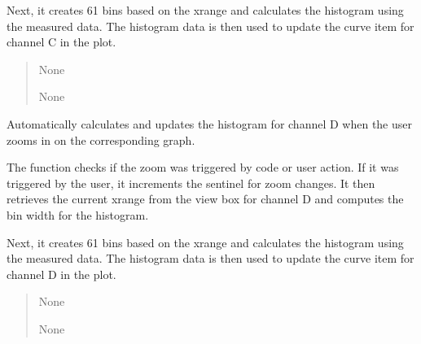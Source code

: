 \documentclass[letterpaper,10pt,english]{sphinxmanual}
\begin{document}
\begin{fulllineitems}
\begin{fulllineitems}
\sphinxAtStartPar
Next, it creates 61 bins based on the x\sphinxhyphen{}range and calculates the histogram 
using the measured data. The histogram data is then used to update the curve 
item for channel C in the plot.
\begin{quote}\begin{description}
\sphinxAtStartPar
None

\sphinxAtStartPar
None

\end{description}\end{quote}

\end{fulllineitems}


\begin{fulllineitems}
\label{\detokenize{StartStopHist:StartStopHist.StartStopLogic.zoom_changedD}}
\pysigstartsignatures
{}
\pysigstopsignatures
\sphinxAtStartPar
Automatically calculates and updates the histogram for channel D when the user 
zooms in on the corresponding graph.

\sphinxAtStartPar
The function checks if the zoom was triggered by code or user action. If it was 
triggered by the user, it increments the sentinel for zoom changes. It then 
retrieves the current x\sphinxhyphen{}range from the view box for channel D and computes the 
bin width for the histogram.

\sphinxAtStartPar
Next, it creates 61 bins based on the x\sphinxhyphen{}range and calculates the histogram 
using the measured data. The histogram data is then used to update the curve 
item for channel D in the plot.
\begin{quote}\begin{description}
\sphinxAtStartPar
None

\sphinxAtStartPar
None

\end{description}\end{quote}

\end{fulllineitems}


\end{fulllineitems}

\end{document}
